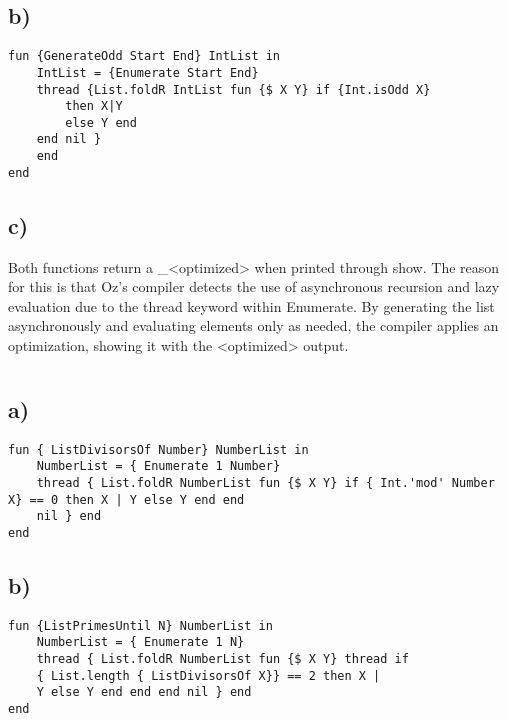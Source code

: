 \documentclass[11pt,a4paper]{report}
\begin{document}
\subsection{b)}
\begin{lstlisting}[language=Oz]
fun {GenerateOdd Start End} IntList in 
    IntList = {Enumerate Start End}
    thread {List.foldR IntList fun {$ X Y} if {Int.isOdd X} 
        then X|Y 
        else Y end 
    end nil }
    end
end
\end{lstlisting}

\subsection{c)}
Both functions return a \_<optimized> when printed through show. The reason for this is that Oz's compiler detects the use of asynchronous recursion and lazy evaluation due to the thread keyword within Enumerate. By generating the list asynchronously and evaluating elements only as needed, the compiler applies an optimization, showing it with the <optimized> output.

\section{}
\subsection{a)}
\begin{lstlisting}[language=Oz]
fun { ListDivisorsOf Number} NumberList in
    NumberList = { Enumerate 1 Number}
    thread { List.foldR NumberList fun {$ X Y} if { Int.'mod' Number X} == 0 then X | Y else Y end end
    nil } end
end
\end{lstlisting}


\subsection{b)}

\begin{lstlisting}[language=Oz]
fun {ListPrimesUntil N} NumberList in
    NumberList = { Enumerate 1 N}
    thread { List.foldR NumberList fun {$ X Y} thread if
    { List.length { ListDivisorsOf X}} == 2 then X |
    Y else Y end end end nil } end
end
\end{lstlisting}

\section{}
\end{document}
